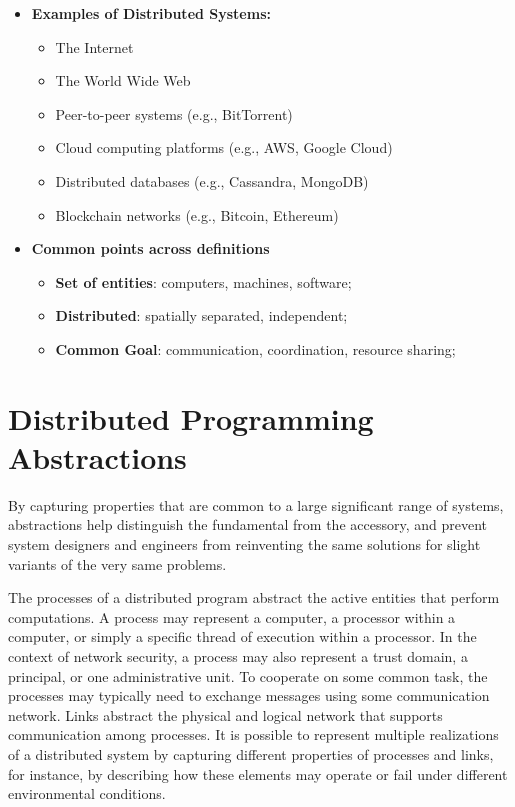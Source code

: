 \documentclass{book}
\begin{document}
\begin{itemize}
    \item \textbf{Examples of Distributed Systems:}
    \begin{itemize}
        \item The Internet
        \item The World Wide Web
        \item Peer-to-peer systems (e.g., BitTorrent)
        \item Cloud computing platforms (e.g., AWS, Google Cloud)
        \item Distributed databases (e.g., Cassandra, MongoDB)
        \item Blockchain networks (e.g., Bitcoin, Ethereum)
    \end{itemize}
    \item \textbf{Common points across definitions}
        \begin{itemize}
            \item \textbf{Set of entities}: computers, machines, software;
            \item \textbf{Distributed}: spatially separated, independent;
            \item \textbf{Common Goal}: communication, coordination, resource sharing;
        \end{itemize}
\end{itemize}


\section{Distributed Programming Abstractions}
By capturing properties that are common to a large significant range of systems, abstractions help distinguish the fundamental from the accessory, and prevent system designers and engineers from reinventing the same solutions for slight variants of the very same problems.

The processes of a distributed program abstract the active entities that perform computations. 
A process may represent a computer, a processor within a computer, or simply a specific thread of execution within a processor. 
In the context of network security, a process may also represent a trust domain, a principal, or one administrative unit. 
To cooperate on some common task, the processes may typically need to exchange messages using some communication network. 
Links abstract the physical and logical network that supports communication among processes. 
It is possible to represent multiple realizations of a distributed system by capturing different properties of processes and links, for instance, by describing how these elements may operate or fail under different environmental conditions.
\end{document}

